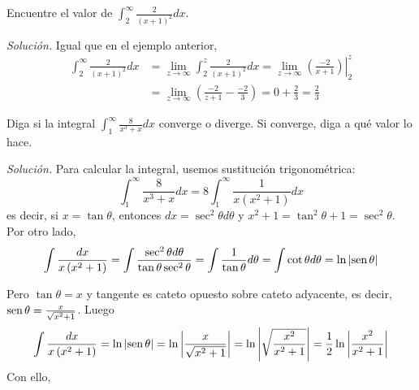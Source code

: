 \begin{ejemplo}
\textnormal{Encuentre el valor de} $\displaystyle \int_{2}^{\infty }\frac{2}{\left( x+1\right) ^{2}}dx$.
\end{ejemplo}
\textit{Solución.} Igual que en el ejemplo anterior,
{\small
\begin{align*}
\int_{2}^{\infty }\frac{2}{\left( x+1\right) ^{2}}dx&=\lim_{z\rightarrow
\infty }\int_{2}^{z}\frac{2}{\left( x+1\right) ^{2}}dx=\left.\lim_{z\rightarrow
\infty }\left( \frac{-2}{x+1}\right)\right\vert_{2}^{z} \\
&=\lim_{z\rightarrow \infty }\left( \frac{-2}{z+1}-\frac{-2}{3}\right) =0+%
\frac{2}{3}=\frac{2}{3}
\end{align*}
}

\begin{ejemplo}
\textnormal{Diga si la integral \textit{$\displaystyle \int_{1}^{\infty }\frac{8}{x^{3}+x}dx$} converge o diverge. Si converge, diga a qué valor lo hace.}
\end{ejemplo}
\textit{Solución.} Para calcular la integral, usemos sustitución trigonométrica:
{\small
\[
\int_{1}^{\infty }\frac{8}{x^{3}+x}dx=8\int_{1}^{\infty }\frac{1}{x\left(
x^{2}+1\right) }dx
\]
}
es decir, si $x=\tan\theta$, entonces $dx=\sec ^{2}\theta d\theta$ y $x^{2}+1=\tan ^{2}\theta +1=\sec ^{2}\theta$. Por otro lado,
{\small
\[
\int \frac{dx}{x\left( x^{2}+1\right) }=\int \frac{\sec ^{2}\theta d\theta }{%
\tan \theta \sec ^{2}\theta }=\int \frac{1}{\tan \theta }d\theta
=\int \cot \theta d\theta =\ln \left\vert \sen \theta \right\vert
\]
}

Pero $\tan\theta=x$ y tangente es cateto opuesto sobre cateto adyacente, es decir, $\text{\rm sen}\,\theta=\frac{x}{\sqrt{x^{2}+1}}$. Luego
{\small
\[
\int \frac{dx}{x\left( x^{2}+1\right) }=\ln \left\vert \text{\rm sen}\, \theta\right\vert=\ln \left\vert \frac{x}{\sqrt{x^{2}+1}} \right\vert=\ln \left\vert \sqrt{
\frac{x^{2}}{x^{2}+1}}\right\vert =\frac{1}{2}\ln \left\vert \frac{x^{2}}{
x^{2}+1}\right\vert
\]
}
Con ello,




